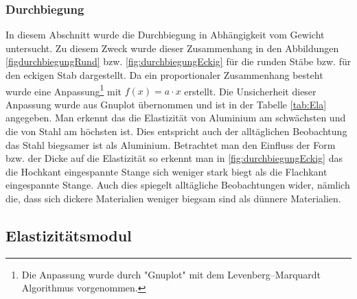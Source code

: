 \subsubsection*{Durchbiegung}
In diesem Abschnitt wurde die Durchbiegung in Abhängigkeit vom Gewicht untersucht. Zu diesem Zweck wurde dieser Zusammenhang in den Abbildungen \ref{figdurchbiegungRund} bzw. \ref{fig:durchbiegungEckig}  für die runden Stäbe bzw. für den eckigen Stab dargestellt. Da ein proportionaler Zusammenhang besteht wurde eine Anpassung\footnote{Die Anpassung wurde durch "Gnuplot" mit dem Levenberg–Marquardt Algorithmus vorgenommen.  }  mit $f(x)=a \cdot x$ erstellt. Die Unsicherheit dieser Anpassung wurde aus Gnuplot übernommen und ist in der Tabelle \ref{tab:Ela} angegeben.
Man erkennt das die Elastizität von Aluminium am schwächsten und die von Stahl am höchsten ist. Dies entspricht auch der alltäglichen Beobachtung das Stahl biegsamer ist als Aluminium.
Betrachtet man den Einfluss der Form bzw. der Dicke auf die Elastizität so erkennt man in \ref{fig:durchbiegungEckig} das die Hochkant eingespannte Stange sich weniger stark biegt als die Flachkant eingespannte Stange. Auch dies spiegelt alltägliche Beobachtungen wider, nämlich die, dass sich dickere Materialien weniger biegsam sind als dünnere Materialien.

\subsection{Elastizitätsmodul}

